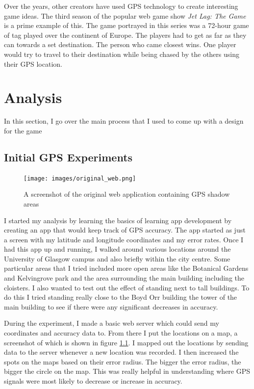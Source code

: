 \documentclass{l4proj}
\begin{document}
Over the years, other creators have used GPS technology to create interesting game ideas. The third season of the popular
web game show \emph{Jet Lag: The Game} is a prime example of this. The game portrayed in this series was a 72-hour game of
tag played over the continent of Europe. The players had to get as far as they can towards a set destination. The person
who came closest wins. One player would try to travel to their destination while being chased by the others using their
GPS location. \citep{Chase2022}

\chapter{Analysis}
\label{analysis}

In this section, I go over the main process that I used to come up with a design for the game

\section{Initial GPS Experiments}
\begin{figure}
    \centering
    \texttt{[image: images/original\_web.png]}
    \caption{A screenshot of the original web application containing GPS shadow areas}
    \label{fig:analysismap}
\end{figure}
I started my analysis by learning the basics of learning app development by creating an app that would keep track
of GPS accuracy. The app started as just a screen with my latitude and longitude coordinates and my error rates.
Once I had this app up and running, I walked around various locations around the University of Glasgow campus and
also briefly within the city centre. Some particular areas that I tried included more open areas like the Botanical
Gardens and Kelvingrove park and the area surrounding the main building including the cloisters. I also wanted to test
out the effect of standing next to tall buildings. To do this I tried standing really close to the Boyd Orr building
the tower of the main building to see if there were any significant decreases in accuracy.

During the experiment, I made a basic web server which could send my coordinates and accuracy data to. From
there I put the locations on a map, a screenshot of which is shown in figure \ref{fig:analysismap}. I mapped
out the locations by sending data to the server whenever a new location was recorded. I then increased the spots
on the maps based on their error radius. The bigger the error radius, the bigger the circle on the map. This was
really helpful in understanding where GPS signals were most likely to decrease or increase in accuracy.
\end{document}

